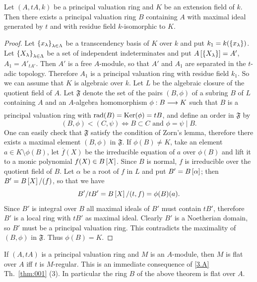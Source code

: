 \documentclass[../main]{subfiles}
\begin{document}
\begin{theorem}
\label{thm:083}
    Let $(A,tA,k)$ be a principal valuation ring and $K$ be an extension field of $k$. Then there exists a principal valuation ring $B$ containing $A$ with maximal ideal generated by $t$ and with residue field $k$-isomorphic to $K$. 
\end{theorem}
\begin{proof}
    Let $\left\{x_\lambda\right\}_{\lambda\in\Lambda}$ be a transcendency basis of $K$ over $k$ and put $k_1 = k(\left\{x_\lambda\right\})$. Let $\left\{X_\lambda\right\}_{\lambda\in\Lambda}$ be a set of independent indeterminates and put $A\left[\left\{X_\lambda\right\}\right]=A'$, $A_1 = A'_{tA'}$. Then $A'$ is a free $A$-module, so that $A'$ and $A_1$ are separated in the $t$-adic topology. Therefore $A_1$ is a principal valuation ring with residue field $k_1$. So we can assume that $K$ is algebraic over $k$. Let $L$ be the algebraic closure of the quotient field of $A$. Let $\mathfrak{F}$ denote the set of the pairs $(B,\phi)$ of a subring $B$ of $L$ containing $A$ and an $A$-algebra homomorphism $\phi: B \varrightarrow{} K$ such that $B$ is a principal valuation ring with $\operatorname{rad}(B) = \operatorname{Ker}(\phi) = tB$, and define an order in $\mathfrak{F}$ by \[(B,\phi) < (C, \psi) \iff B\subset C \text{ and } \phi = \psi\mid B.\] One can easily check that $\mathfrak{F}$ satisfy the condition of Zorn's lemma, therefore there exists a maximal element $(B,\phi)$ in $\mathfrak{F}$. If $\phi(B) \neq K$, take an element $a \in K\setminus\phi(B)$, let $\overline{f}(X)$ be the irreducible equation of $a$ over $\phi(B)$ and lift it to a monic polynomial $f(X) \in B\left[X\right]$. Since $B$ is normal, $f$ is irreducible over the quotient field of $B$. Let $\alpha$ be a root of $f$ in $L$ and put $B' = B\left[\alpha\right]$; then $B' = B\left[X\right]/(f)$, so that we have \[B'/tB' = B\left[X\right]/(t,f) = \phi(B)(a).\] Since $B'$ is integral over $B$ all maximal ideals of $B'$ must contain $tB'$, therefore $B'$ is a local ring with $tB'$ as maximal ideal. Clearly $B'$ is a Noetherian domain, so $B'$ must be a principal valuation ring. This contradicts the maximality of $(B,\phi)$ in $\mathfrak{F}$. Thus $\phi(B) = K$.
\end{proof}
\begin{remark}
\label{rem:37.01}
    If $(A, tA)$ is a principal valuation ring and $M$ is an $A$-module, then $M$ is flat over $A$ iff $t$ is $M$-regular. This is an immediate consequence of \ref{3.A} Th.~\ref{thm:001} (3). In particular the ring $B$ of the above theorem is flat over $A$. 
\end{remark}
\end{document}
